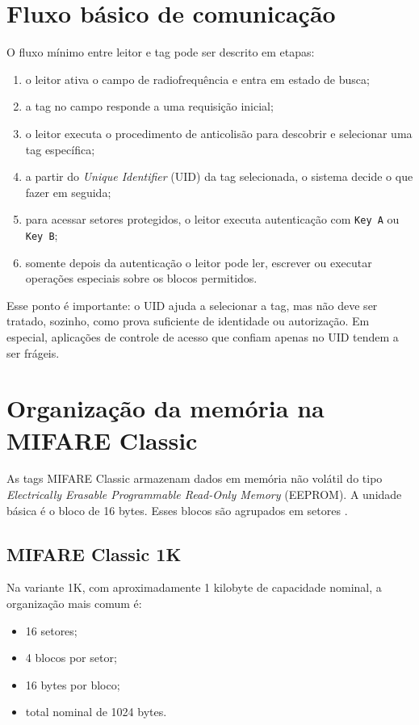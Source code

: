 \section{Fluxo básico de comunicação}
O fluxo mínimo entre leitor e tag pode ser descrito em etapas:
\begin{enumerate}[leftmargin=*]
  \item o leitor ativa o campo de radiofrequência e entra em estado de busca;
  \item a tag no campo responde a uma requisição inicial;
  \item o leitor executa o procedimento de anticolisão para descobrir e selecionar uma tag específica;
  \item a partir do \textit{Unique Identifier} (UID) da tag selecionada, o sistema decide o que fazer em seguida;
  \item para acessar setores protegidos, o leitor executa autenticação com \texttt{Key A} ou \texttt{Key B};
  \item somente depois da autenticação o leitor pode ler, escrever ou executar operações especiais sobre os blocos permitidos.
\end{enumerate}

Esse ponto é importante: o UID ajuda a selecionar a tag, mas não deve ser tratado, sozinho, como prova suficiente de identidade ou autorização. Em especial, aplicações de controle de acesso que confiam apenas no UID tendem a ser frágeis.

\section{Organização da memória na MIFARE Classic}
As tags MIFARE Classic armazenam dados em memória não volátil do tipo \textit{Electrically Erasable Programmable Read-Only Memory} (EEPROM). A unidade básica é o bloco de 16 bytes. Esses blocos são agrupados em setores \citep{nxp_mifare_classic_ev1}.

\subsection{MIFARE Classic 1K}
Na variante 1K, com aproximadamente 1 kilobyte de capacidade nominal, a organização mais comum é:
\begin{itemize}[leftmargin=*]
  \item 16 setores;
  \item 4 blocos por setor;
  \item 16 bytes por bloco;
  \item total nominal de 1024 bytes.
\end{itemize}

